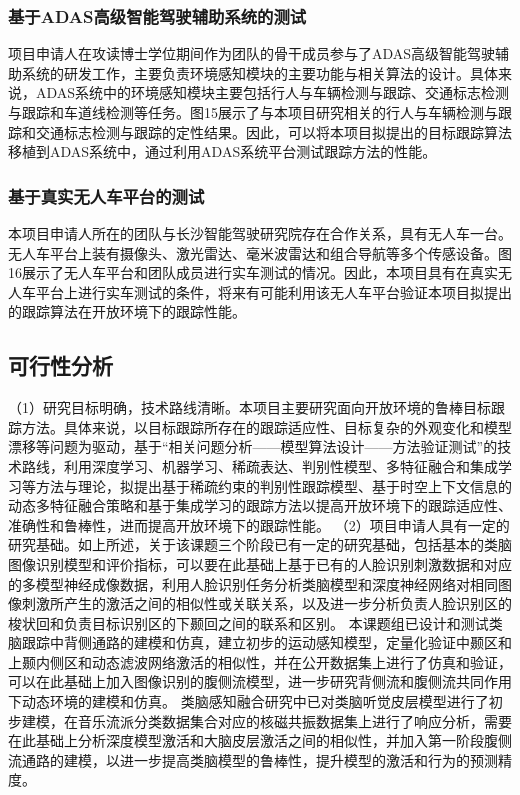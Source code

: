 \documentclass[a4paper,zihao=-4]{article}
\begin{document}
\subsubsection{基于ADAS高级智能驾驶辅助系统的测试}
项目申请人在攻读博士学位期间作为团队的骨干成员参与了ADAS高级智能驾驶辅助系统的研发工作，主要负责环境感知模块的主要功能与相关算法的设计。具体来说，ADAS系统中的环境感知模块主要包括行人与车辆检测与跟踪、交通标志检测与跟踪和车道线检测等任务。图15展示了与本项目研究相关的行人与车辆检测与跟踪和交通标志检测与跟踪的定性结果。因此，可以将本项目拟提出的目标跟踪算法移植到ADAS系统中，通过利用ADAS系统平台测试跟踪方法的性能。

\subsubsection{基于真实无人车平台的测试}
本项目申请人所在的团队与长沙智能驾驶研究院存在合作关系，具有无人车一台。无人车平台上装有摄像头、激光雷达、毫米波雷达和组合导航等多个传感设备。图16展示了无人车平台和团队成员进行实车测试的情况。因此，本项目具有在真实无人车平台上进行实车测试的条件，将来有可能利用该无人车平台验证本项目拟提出的跟踪算法在开放环境下的跟踪性能。


\subsection{可行性分析}
（1）研究目标明确，技术路线清晰。本项目主要研究面向开放环境的鲁棒目标跟踪方法。具体来说，以目标跟踪所存在的跟踪适应性、目标复杂的外观变化和模型漂移等问题为驱动，基于“相关问题分析——模型算法设计——方法验证测试”的技术路线，利用深度学习、机器学习、稀疏表达、判别性模型、多特征融合和集成学习等方法与理论，拟提出基于稀疏约束的判别性跟踪模型、基于时空上下文信息的动态多特征融合策略和基于集成学习的跟踪方法以提高开放环境下的跟踪适应性、准确性和鲁棒性，进而提高开放环境下的跟踪性能。
（2）项目申请人具有一定的研究基础。如上所述，关于该课题三个阶段已有一定的研究基础，包括基本的类脑图像识别模型和评价指标，可以要在此基础上基于已有的人脸识别刺激数据和对应的多模型神经成像数据，利用人脸识别任务分析类脑模型和深度神经网络对相同图像刺激所产生的激活之间的相似性或关联关系，以及进一步分析负责人脸识别区的梭状回和负责目标识别区的下颞回之间的联系和区别。
本课题组已设计和测试类脑跟踪中背侧通路的建模和仿真，建立初步的运动感知模型，定量化验证中颞区和上颞内侧区和动态滤波网络激活的相似性，并在公开数据集上进行了仿真和验证，可以在此基础上加入图像识别的腹侧流模型，进一步研究背侧流和腹侧流共同作用下动态环境的建模和仿真。
类脑感知融合研究中已对类脑听觉皮层模型进行了初步建模，在音乐流派分类数据集合对应的核磁共振数据集上进行了响应分析，需要在此基础上分析深度模型激活和大脑皮层激活之间的相似性，并加入第一阶段腹侧流通路的建模，以进一步提高类脑模型的鲁棒性，提升模型的激活和行为的预测精度。
\end{document}
